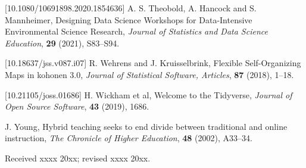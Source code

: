 \documentclass{aims}
\theoremstyle{definition}
\begin{document}
\begin{thebibliography}{99}
 [10.1080/10691898.2020.1854636]
     \newblock A. S. Theobold, A. Hancock and S. Mannheimer,
     \newblock  Designing Data Science Workshops for Data-Intensive Environmental Science Research,
     \newblock \emph{Journal of Statistics and Data Science Education}, \textbf{29} (2021), S83--S94.

 [10.18637/jss.v087.i07]
     \newblock R. Wehrens and J. Kruisselbrink,
     \newblock  Flexible Self-Organizing Maps in kohonen 3.0,
     \newblock \emph{Journal of Statistical Software, Articles}, \textbf{87} (2018), 1--18.

 [10.21105/joss.01686]
     \newblock H. Wickham et al,
     \newblock  Welcome to the Tidyverse,
     \newblock \emph{Journal of Open Source Software}, \textbf{43} (2019), 1686.

     \newblock  J. Young,
     \newblock Hybrid teaching seeks to end divide between traditional and online instruction,
     \newblock \emph{The Chronicle of Higher Education}, \textbf{48} (2002), A33--34.

\end{thebibliography}

\medskip
Received xxxx 20xx; revised xxxx 20xx.
\medskip
\end{document}
